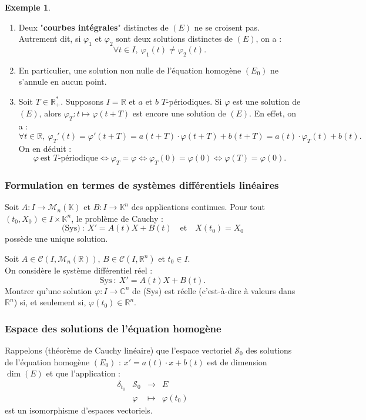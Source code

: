 \documentclass[french]{article}
\newcommand{\R}{\mathbb{R}}
\newcommand{\C}{\mathbb{C}}
\newcommand{\K}{\mathbb{K}}
\newcommand{\st}{^*}
\theoremstyle{plain}
\theoremstyle{definition}
\newtheorem*{ex}{Exemple}
\theoremstyle{remark}
\begin{document}
\begin{ex}
	\begin{enumerate}
		\item Deux "\textbf{courbes intégrales}" distinctes de $(E)$ ne se croisent pas. Autrement dit, si $\varphi_1$ et $\varphi_2$ sont deux solutions distinctes de $(E)$, on a :
		$$\forall t\in I,\ \varphi_1(t)\ne\varphi_2(t).$$
		\item En particulier, une solution non nulle de l'équation homogène $(E_0)$ ne s'annule en aucun point.
		\item Soit $T\in\R_+\st$. Supposons $I=\R$ et $a$ et $b$ $T$-périodiques. Si $\varphi$ est une solution de $(E)$, alors $\varphi_T:t\mapsto\varphi(t+T)$ est encore une solution de $(E)$. En effet, on a :
		$$\forall t\in\R,\ \varphi_T'(t)=\varphi'(t+T)=a(t+T)\cdot\varphi(t+T)+b(t+T)=a(t)\cdot\varphi_T(t)+b(t).$$
		On en déduit :
		$$\varphi\ \text{est $T$-périodique}\iff\varphi_T=\varphi\iff\varphi_T(0)=\varphi(0)\iff\varphi(T)=\varphi(0).$$
	\end{enumerate}
\end{ex}

\subsubsection*{Formulation en termes de systèmes différentiels linéaires}

Soit $A:I\to\mathcal{M}_n(\K)$ et $B:I\to\K^n$ des applications continues. Pour tout $(t_0,X_0)\in I\times\K^n$, le problème de Cauchy :
$$\text{(Sys)}\ :\ X'=A(t)X+B(t)\quad\text{et}\quad X(t_0)=X_0$$ possède une unique solution.

\begin{exo}
	Soit $A\in\mathcal{C}(I,\mathcal{M}_n(\R))$, $B\in\mathcal{C}(I,\R^n)$ et $t_0\in I$.\\
	On considère le système différentiel réel :
	$$\text{Sys}\ :\ X'=A(t)X+B(t).$$
	Montrer qu'une solution $\varphi:I\to\C^n$ de (Sys) est réelle (c'est-à-dire à valeurs dans $\R^n$) si, et seulement si, $\varphi(t_0)\in\R^n$.
\end{exo}

\subsubsection*{Espace des solutions de l'équation homogène}

Rappelons (théorème de Cauchy linéaire) que l'espace vectoriel $\mathcal{S}_0$ des solutions de l'équation homogène $(E_0)$ : $x'=a(t)\cdot x+b(t)$ est de dimension $\dim(E)$ et que l'application :
$$\begin{array}{lrcl}
	\delta_{t_0}&\mathcal{S}_0&\longrightarrow&E\\
	&\varphi&\longmapsto&\varphi(t_0)
\end{array}$$ est un isomorphisme d'espaces vectoriels.
\end{document}
